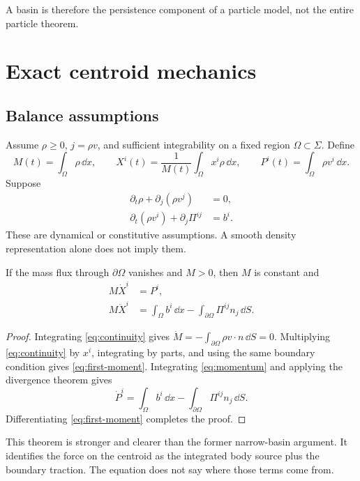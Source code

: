 \documentclass[11pt]{article}
\begin{document}
A basin is therefore the persistence component of a particle model, not the
entire particle theorem.

\section{Exact centroid mechanics}

\subsection{Balance assumptions}

Assume $\rho\geq0$, $j=\rho v$, and sufficient integrability on a fixed region
$\Omega\subset\Sigma$.  Define
\[
 M(t)=\int_\Omega \rho\,\dd x,\qquad
 X^i(t)=\frac{1}{M(t)}\int_\Omega x^i\rho\,\dd x,\qquad
 P^i(t)=\int_\Omega \rho v^i\,\dd x.
\]
Suppose
\begin{align}
 \partial_t\rho+\partial_j(\rho v^j)&=0,
 \label{eq:continuity}\\
 \partial_t(\rho v^i)+\partial_j\Pi^{ij}&=b^i.
 \label{eq:momentum}
\end{align}
These are dynamical or constitutive assumptions.  A smooth density
representation alone does not imply them.

\begin{theorem}\label{thm:centroid}
If the mass flux through $\partial\Omega$ vanishes and $M>0$, then $M$ is
constant and
\begin{align}
 M\dot X^i&=P^i,\label{eq:first-moment}\\
 M\ddot X^i
 &=\int_\Omega b^i\,\dd x
   -\int_{\partial\Omega}\Pi^{ij}n_j\,\dd S.
 \label{eq:centroid}
\end{align}
\end{theorem}

\begin{proof}
Integrating \cref{eq:continuity} gives
$\dot M=-\int_{\partial\Omega}\rho v\cdot n\,\dd S=0$.
Multiplying \cref{eq:continuity} by $x^i$, integrating by parts, and using the
same boundary condition gives \cref{eq:first-moment}.  Integrating
\cref{eq:momentum} and applying the divergence theorem gives
\[
 \dot P^i
 =\int_\Omega b^i\,\dd x
  -\int_{\partial\Omega}\Pi^{ij}n_j\,\dd S.
\]
Differentiating \cref{eq:first-moment} completes the proof.
\end{proof}

This theorem is stronger and clearer than the former narrow-basin argument.
It identifies the force on the centroid as the integrated body source plus
the boundary traction.  The equation does not say where those terms come
from.
\end{document}
